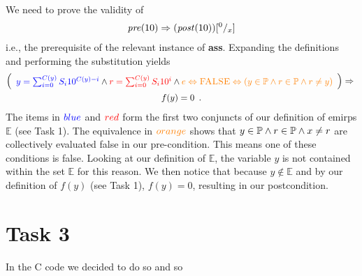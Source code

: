 \documentclass[headings=small,a4paper,12pt]{scrartcl}
\newcommand{\pre}{\mathit{pre}}
\newcommand{\post}{\mathit{post}}
\newcommand{\emirp}{\mathbb{E}}
\newcommand{\primeset}{\mathbb{P}}
\begin{document}
We need to prove the validity of
\begin{gather*}
  \pre(10) \Implies (\post(10))\subst{0}x
\end{gather*}
i.e., the prerequisite of the relevant instance of \textbf{ass}.
Expanding the definitions and performing the substitution yields
\begin{gather*}
  \left(
    \begin{array}{l}
      {\color{blue}y=\sum_{i=0}^{C(y)} S_i 10^{C(y)-i}}\And {\color{red}r=\sum_{i=0}^{C(y)} S_i 10^i}\And {\color{orange}e\EQUIV\textsc{FALSE}\EQUIV(y\in\primeset\And r\in\primeset\And r\neq y)}
    \end{array}
  \right) \Implies{}\\
  f(y)=0\enskip.
\end{gather*}
The items in ${\color{blue}blue}$ and ${\color{red}red}$ form the first two conjuncts of our definition of emirps $\emirp$ (see Task 1). The equivalence in ${\color{orange}orange}$ shows that $y\in\primeset\And r\in\primeset \And x\neq r$ are collectively evaluated false in our pre-condition.  This means one of these conditions is false.  Looking at our definition of $\emirp$, the variable $y$ is not contained within the set $\emirp$ for this reason. We then notice that because $y\notin\emirp$ and by our definition of $f(y)$ (see Task 1), $f(y)=0$, resulting in our postcondition.

\pagebreak
\section{Task 3}
\label{sec:task-3}



In the C code we decided to do so and so
\end{document}
